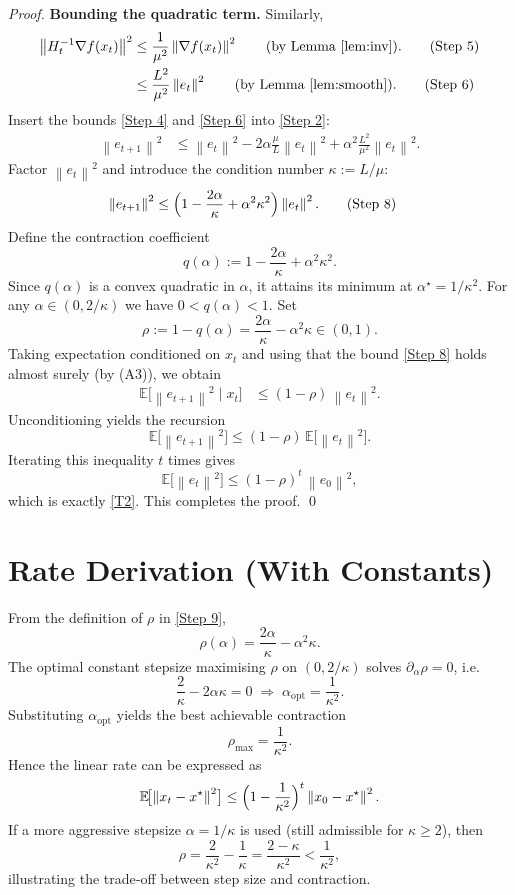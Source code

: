 \documentclass{article}
\newcommand{\E}{\mathbb{E}}
\newcommand{\norm}[1]{\left\lVert #1\right\rVert}
\begin{document}
\begin{proof}
\medskip\noindent\textbf{Bounding the quadratic term.}
Similarly,
\begin{align}
   \norm{H_t^{-1}\nabla f(x_t)}^{2}
   &\le \frac{1}{\mu^{2}}\norm{\nabla f(x_t)}^{2}
        \qquad\text{(by Lemma~\ref{lem:inv})}. \tag{Step 5}\\
   &\le \frac{L^{2}}{\mu^{2}}\norm{e_t}^{2}
        \qquad\text{(by Lemma~\ref{lem:smooth})}. \tag{Step 6}
\end{align}
Insert the bounds \eqref{Step 4} and \eqref{Step 6} into \eqref{Step 2}:
\begin{align}
   \norm{e_{t+1}}^{2}
   &\le \norm{e_t}^{2}
        -2\alpha\frac{\mu}{L}\norm{e_t}^{2}
        +\alpha^{2}\frac{L^{2}}{\mu^{2}}\norm{e_t}^{2}. \tag{Step 7}
\end{align}
Factor $\norm{e_t}^{2}$ and introduce the condition number $\kappa:=L/\mu$:
\begin{align}
   \norm{e_{t+1}}^{2}
   &\le \Bigl(1-\frac{2\alpha}{\kappa}+\alpha^{2}\kappa^{2}\Bigr)\norm{e_t}^{2}. \tag{Step 8}
\end{align}
Define the contraction coefficient
\[
   q(\alpha):=1-\frac{2\alpha}{\kappa}+\alpha^{2}\kappa^{2}.
\]
Since $q(\alpha)$ is a convex quadratic in $\alpha$, it attains its minimum at
$\alpha^{\star}=1/\kappa^{2}$.  For any $\alpha\in(0,2/\kappa)$ we have
$0<q(\alpha)<1$.  Set
\[
   \rho:=1-q(\alpha)=\frac{2\alpha}{\kappa}-\alpha^{2}\kappa
        \in(0,1). \tag{Step 9}
\]
Taking expectation conditioned on $x_t$ and using that the bound \eqref{Step 8}
holds almost surely (by (A3)), we obtain
\begin{align}
   \E\!\bigl[\norm{e_{t+1}}^{2}\mid x_t\bigr]
   &\le (1-\rho)\,\norm{e_t}^{2}. \tag{Step 10}
\end{align}
Unconditioning yields the recursion
\[
   \E\!\bigl[\norm{e_{t+1}}^{2}\bigr]
   \le (1-\rho)\,\E\!\bigl[\norm{e_t}^{2}\bigr].
\]
Iterating this inequality $t$ times gives
\[
   \E\!\bigl[\norm{e_{t}}^{2}\bigr]
   \le (1-\rho)^{t}\,\norm{e_{0}}^{2}, \tag{Step 11}
\]
which is exactly \eqref{T2}.  This completes the proof. \qed
\end{proof}

\section*{Rate Derivation (With Constants)}
From the definition of $\rho$ in \eqref{Step 9},
\[
   \rho(\alpha)=\frac{2\alpha}{\kappa}-\alpha^{2}\kappa.
\]
The optimal constant stepsize maximising $\rho$ on $(0,2/\kappa)$ solves
$\partial_{\alpha}\rho=0$, i.e.
\[
   \frac{2}{\kappa}-2\alpha\kappa=0
   \;\Longrightarrow\;
   \alpha_{\text{opt}}=\frac{1}{\kappa^{2}}.
\]
Substituting $\alpha_{\text{opt}}$ yields the best achievable contraction
\[
   \rho_{\max}= \frac{1}{\kappa^{2}}.
\]
Hence the linear rate can be expressed as
\[
   \E\!\bigl[\norm{x_{t}-x^{\star}}^{2}\bigr]
   \le\Bigl(1-\frac{1}{\kappa^{2}}\Bigr)^{t}\norm{x_{0}-x^{\star}}^{2}.
\]
If a more aggressive stepsize $\alpha=1/\kappa$ is used (still admissible for
$\kappa\ge2$), then
\[
   \rho = \frac{2}{\kappa^{2}}-\frac{1}{\kappa}= \frac{2-\kappa}{\kappa^{2}}<\frac{1}{\kappa^{2}},
\]
illustrating the trade‑off between step size and contraction.
\end{document}
